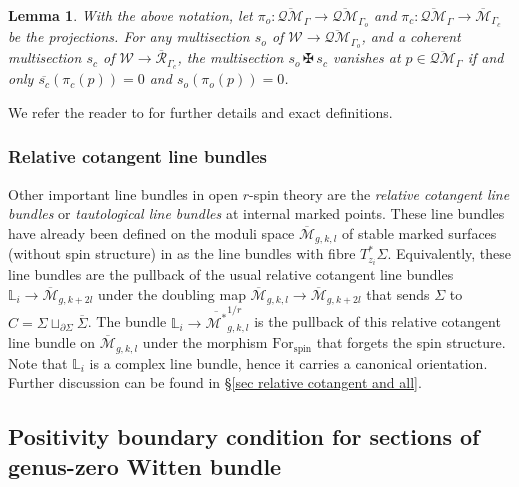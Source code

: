 \documentclass[11pt]{amsart}
\newtheorem{lem}[dummy]{Lemma}
\theoremstyle{definition}
\theoremstyle{remark}
\newcommand{\Ass}{{{\,\maltese\,}}}
\newcommand{\oQMb}{{\overline{\mathcal{QM}}}}
\newcommand{\<}{\left<}
\renewcommand{\>}{\right>}
\numberwithin{equation}{section}
\def\Mbar{{\overline{\mathcal M}}}
\def\Mbarstar{{\overline{\mathcal M^*}}}
\begin{document}
\begin{lem} \label{lem zero of assembling}
    With the above notation, let $\pi_o\colon \oQMb_\Gamma \to \oQMb_{\Gamma_o}$ %
and $\pi_c\colon \oQMb_\Gamma \to \Mbar_{\Gamma_c}$ be %
the projections.
    For any multisection $s_o$ of $\mathcal W \to \oQMb_{\Gamma_o}$, and a coherent multisection $s_c$ of $\mathcal W \to \overline{\mathcal R}_{\Gamma_c}$, the multisection $s_o\Ass s_c$ vanishes at $p\in \oQMb_\Gamma$ if and only $\overline{s_c}(\pi_c(p))=0$ and $s_o(\pi_o(p))=0$.
\end{lem}

We refer the reader to \cite[\S 4.1.3]{BCT2} for further details and exact definitions.

\subsubsection{Relative cotangent line bundles}
Other important line bundles in open $r$-spin theory are the \emph{relative cotangent line bundles} or \emph{tautological line bundles} at internal marked points. These line bundles have already been defined on the moduli space $\Mbar_{g,k,l}$ of stable marked surfaces (without %
spin structure) in \cite{PST14} as the line bundles with fibre $T^*_{z_i}\Sigma$. Equivalently, these line %
bundles are the pullback of the usual relative cotangent line bundles ${\mathbb{L}}_i\to\Mbar_{g,k+2l}$ under the doubling map $\Mbar_{g,k,l} \to \Mbar_{g,k+2l}$ that sends $\Sigma$ to $C=\Sigma\sqcup_{\partial\Sigma}\overline{\Sigma}$.  The bundle $\mathbb{L}_i\to\Mbarstar_{g,k,l}^{1/r}$ is the pullback of this relative cotangent line bundle on $\Mbar_{g,k,l}$ under the morphism $\text{For}_{\text{spin}}$ that forgets the spin structure.  Note that $\mathbb{L}_i$ is a complex line bundle, hence it carries %
a canonical orientation. Further discussion can be found in \S \ref{sec relative  cotangent and all}.

\subsection{Positivity boundary condition for sections of genus-zero Witten bundle}\label{sec positivity constraint}
\end{document}
